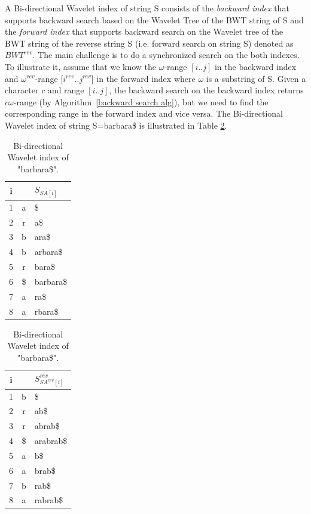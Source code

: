 \documentclass[11pt,a4paper]{report}
\begin{document}
A Bi-directional Wavelet index of string S consists of \cite{bidirectional}
the \emph{backward index} that supports backward search based on the Wavelet Tree of 
the BWT string of S and the \emph{forward index} that supports backward search
on the Wavelet tree of the BWT string of the reverse string S (i.e. forward 
search on string S) denoted as $BWT^{rev}$. The main challenge is to do a 
synchronized search on the both indexes.
To illustrate it, assume that we know the $\omega$-range $[i..j]$ in the backward 
index and $\omega^{rev}$-range [$i^{rev}$..$j^{rev}$] in the forward index 
where $\omega$ is a substring of S.
Given a character $c$ and range $[i..j]$, the backward search on the backward 
index returns $c\omega$-range (by Algorithm~\ref{backward search alg}), 
but we need to find the corresponding range in the forward index and vice versa.
The Bi-directional Wavelet index of string S=barbara\$ is 
illustrated in Table \ref{bi-dir_barbara}.

\begin{table}[h]
\parbox{.45\linewidth}{
\centering
\begin{tabular}{ccl}
i& &$S_{SA[i]}$\\
\hline
1 & a & \$ \\
2 & r & a\$ \\
3 & b & ara\$ \\
4 & b & arbara\$ \\
5 & r & bara\$ \\
6 & \$ & barbara\$ \\
7 & a & ra\$ \\
8 & a & rbara\$ 
\end{tabular}
}
\hfill
\parbox{.45\linewidth}{
\centering
\begin{tabular}{ccl}
i&&$S^{rev}_{SA^{rev}[i]}$\\
\hline
1 & b & \$ \\
2 & r & ab\$ \\
3 & r & abrab\$ \\
4 & \$ & arabrab\$ \\
5 & a & b\$ \\
6 & a & brab\$ \\
7 & b & rab\$ \\
8 & a & rabrab\$ 
\end{tabular}
}
\caption{Bi-directional Wavelet index of "barbara\$".}
\label{bi-dir_barbara}

\end{table}
\end{document}
